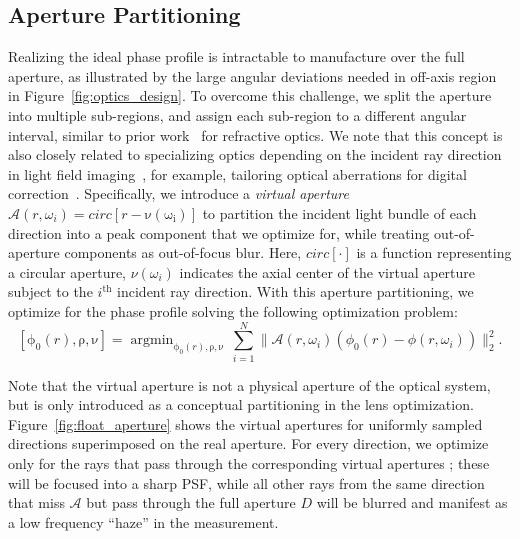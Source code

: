  
\subsection{Aperture Partitioning}
%
Realizing the ideal phase profile is intractable to manufacture over the full aperture, as illustrated by the large angular deviations needed in off-axis region in Figure~\ref{fig:optics_design}.
To overcome this challenge,
we split the aperture into multiple sub-regions, and
assign each sub-region to a different angular interval, similar to prior work~\cite{levin20094d,zhu2013design} for refractive optics. 
 We note that this concept is also closely related to specializing optics depending on the incident ray direction in light field imaging~\cite{ng2005light}, for example, tailoring optical aberrations for digital correction~\cite{ng2012correction}. 
Specifically, we introduce a \emph{virtual aperture} $\mathcal{A}(r,\omega_i) =
circ[r-\mathrm{\nu(\omega_i)}]$ to partition the incident light bundle
of each direction into a peak component that we optimize for, while treating out-of-aperture 
components as out-of-focus blur. 
Here, $circ[\cdot]$ is a function representing a circular aperture, $\nu(\omega_i)$ indicates the axial center of the virtual
aperture subject to the $i^{\text{th}}$ incident ray direction. With this aperture partitioning, we optimize for the phase profile solving the following optimization problem: 
\begin{equation}
\label{eq:lensOptim}
[\mathrm{\phi_0}(r),\mathrm{\rho},\mathrm{\nu}] = \mathop{\arg\min}_{\mathrm{\phi_0}(r),\mathrm{\rho,\mathrm{\nu}}}
\,\sum_{i=1}^{N} \|\mathcal{A}(r,\omega_i)(\phi_0(r)-\phi(r,\omega_i))\|_{2}^{2}. 
\end{equation}

Note that the virtual aperture is not a physical aperture
of the optical system, but is only  introduced as a conceptual partitioning in the lens optimization.
Figure~\ref{fig:float_aperture} shows the virtual apertures for uniformly sampled directions
superimposed on the real aperture.  For every direction, we optimize only
for the rays that pass through the  corresponding virtual apertures ; these
will be focused into a sharp PSF, while all other rays from the same
direction that miss $\mathcal{A}$ but pass through the full aperture
$D$ will be blurred and manifest as a low frequency ``haze'' in the measurement.

